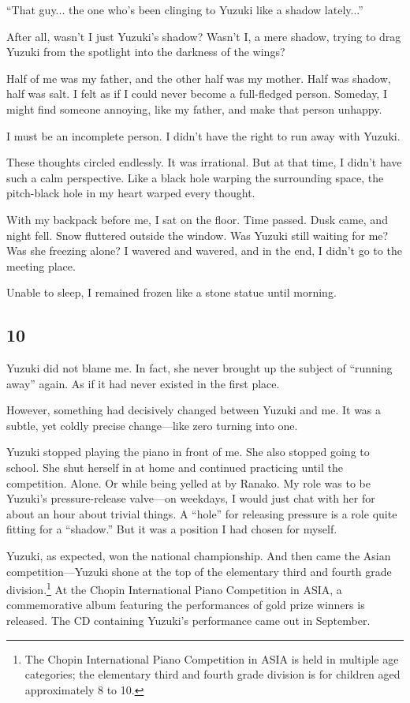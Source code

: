 \documentclass[
    a4paper,
    12pt,
    twoside,
    openany,
    UTF8,
    fontset=windows
]{ctexbook}
\begin{document}
``That guy... the one who's been clinging to Yuzuki like a shadow lately...''

After all, wasn't I just Yuzuki's shadow? Wasn't I, a mere shadow, trying to drag Yuzuki from the spotlight into the darkness of the wings?

Half of me was my father, and the other half was my mother. Half was shadow, half was salt. I felt as if I could never become a full-fledged person. Someday, I might find someone annoying, like my father, and make that person unhappy.

I must be an incomplete person. I didn't have the right to run away with Yuzuki.

These thoughts circled endlessly. It was irrational. But at that time, I didn't have such a calm perspective. Like a black hole warping the surrounding space, the pitch-black hole in my heart warped every thought.

With my backpack before me, I sat on the floor. Time passed. Dusk came, and night fell. Snow fluttered outside the window. Was Yuzuki still waiting for me? Was she freezing alone? I wavered and wavered, and in the end, I didn't go to the meeting place.

Unable to sleep, I remained frozen like a stone statue until morning.

\subsection*{10}

Yuzuki did not blame me. In fact, she never brought up the subject of ``running away'' again. As if it had never existed in the first place.

However, something had decisively changed between Yuzuki and me. It was a subtle, yet coldly precise change---like zero turning into one.

Yuzuki stopped playing the piano in front of me. She also stopped going to school. She shut herself in at home and continued practicing until the competition. Alone. Or while being yelled at by Ranako. My role was to be Yuzuki's pressure-release valve---on weekdays, I would just chat with her for about an hour about trivial things. A ``hole'' for releasing pressure is a role quite fitting for a ``shadow.'' But it was a position I had chosen for myself.

Yuzuki, as expected, won the national championship. And then came the Asian competition---Yuzuki shone at the top of the elementary third and fourth grade division.\footnote{The Chopin International Piano Competition in ASIA is held in multiple age categories; the elementary third and fourth grade division is for children aged approximately 8 to 10.} At the Chopin International Piano Competition in ASIA, a commemorative album featuring the performances of gold prize winners is released. The CD containing Yuzuki's performance came out in September.
\end{document}
